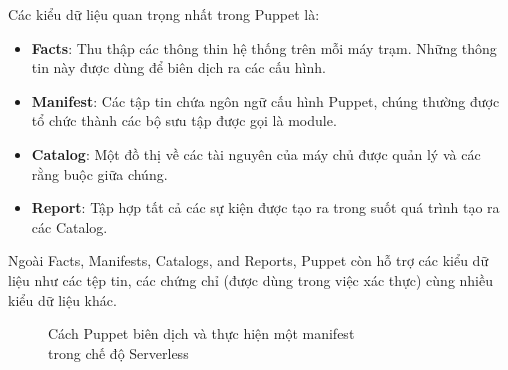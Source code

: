 Các kiểu dữ liệu quan trọng nhất trong Puppet là:

\begin{itemize}
\item \textbf{Facts}: Thu thập các thông thin hệ thống trên mỗi máy trạm. Những thông tin này được dùng để biên dịch ra các cấu hình.

\item \textbf{Manifest}: Các tập tin chứa ngôn ngữ cấu hình Puppet, chúng thường được tổ chức thành các bộ sưu tập được gọi là module.

\item \textbf{Catalog}: Một đồ thị về các tài nguyên của máy chủ được quản lý và các rằng buộc giữa chúng.

\item \textbf{Report}: Tập hợp tất cả các sự kiện được tạo ra trong suốt quá trình tạo ra các Catalog.
\end{itemize}

Ngoài Facts, Manifests, Catalogs, and Reports, Puppet còn hỗ trợ các kiểu dữ liệu như các tệp tin, các chứng chỉ (được dùng trong việc xác thực) cùng nhiều kiểu dữ liệu khác.

\begin{figure}[h!]
    \begin{center}
    \end{center}
    \caption{Cách Puppet biên dịch và thực hiện một manifest\\ trong chế độ Serverless}
    \label{fig:puppet_dataflow}
\end{figure}


